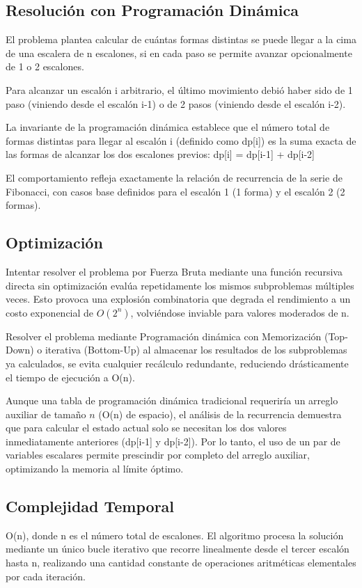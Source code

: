 \documentclass[12pt, a4paper]{article}
\begin{document}
\subsection{Resolución con Programación Dinámica}
El problema plantea calcular de cuántas formas distintas se puede llegar a la cima de una escalera de n escalones, si en cada paso se permite avanzar opcionalmente de 1 o 2 escalones.

Para alcanzar un escalón i arbitrario, el último movimiento debió haber sido de 1 paso (viniendo desde el escalón i-1) o de 2 pasos (viniendo desde el escalón i-2).

La invariante de la programación dinámica establece que el número total de formas distintas para llegar al escalón i (definido como dp[i]) es la suma exacta de las formas de alcanzar los dos escalones previos:
dp[i] = dp[i-1] + dp[i-2]

El comportamiento refleja exactamente la relación de recurrencia de la serie de Fibonacci, con casos base definidos para el escalón 1 (1 forma) y el escalón 2 (2 formas).

\subsection{Optimización}
Intentar resolver el problema por Fuerza Bruta mediante una función recursiva directa sin optimización evalúa repetidamente los mismos subproblemas múltiples veces. Esto provoca una explosión combinatoria que degrada el
rendimiento a un costo exponencial de $O(2^n)$, volviéndose inviable para valores moderados de n.

Resolver el problema mediante Programación dinámica con Memorización (Top-Down) o iterativa (Bottom-Up) al almacenar los resultados de los subproblemas ya calculados, se evita cualquier recálculo redundante, reduciendo
drásticamente el tiempo de ejecución a O(n).

Aunque una tabla de programación dinámica tradicional requeriría un arreglo auxiliar de tamaño $n$ (O(n) de espacio), el análisis de la recurrencia demuestra que para calcular el estado actual solo se necesitan los dos valores 
inmediatamente anteriores (dp[i-1] y dp[i-2]). Por lo tanto, el uso de un par de variables escalares permite prescindir por completo del arreglo auxiliar, optimizando la memoria al límite óptimo.

\subsection{Complejidad Temporal}
O(n), donde n es el número total de escalones. El algoritmo procesa la solución mediante un único bucle iterativo que recorre linealmente desde el tercer escalón hasta n, realizando una cantidad constante de operaciones aritméticas 
elementales por cada iteración.
\end{document}
